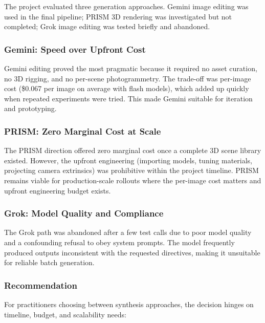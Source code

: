 \documentclass[12pt,a4paper]{article}
\begin{document}
The project evaluated three generation approaches. Gemini image editing was used in the final pipeline; PRISM 3D rendering was investigated but not completed; Grok image editing was tested briefly and abandoned.

\subsubsection{Gemini: Speed over Upfront Cost}

Gemini editing proved the most pragmatic because it required no asset curation, no 3D rigging, and no per-scene photogrammetry. The trade-off was per-image cost (\$0.067 per image on average with flash models), which added up quickly when repeated experiments were tried. This made Gemini suitable for iteration and prototyping.

\subsubsection{PRISM: Zero Marginal Cost at Scale}

The PRISM direction offered zero marginal cost once a complete 3D scene library existed. However, the upfront engineering (importing models, tuning materials, projecting camera extrinsics) was prohibitive within the project timeline. PRISM remains viable for production-scale rollouts where the per-image cost matters and upfront engineering budget exists.

\subsubsection{Grok: Model Quality and Compliance}

The Grok path was abandoned after a few test calls due to poor model quality and a confounding refusal to obey system prompts. The model frequently produced outputs inconsistent with the requested directives, making it unsuitable for reliable batch generation.

\subsubsection{Recommendation}

For practitioners choosing between synthesis approaches, the decision hinges on timeline, budget, and scalability needs:
\end{document}
